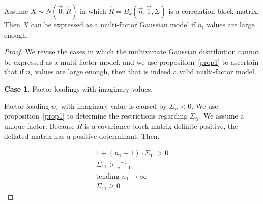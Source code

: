 \documentclass[11pt,fleqn]{book} %
\begin{document}
\begin{proposition}
	\label{prop:gmfamgb}
	Assume $X \sim N(\vec{0},\widehat{R})$ in which 
	$\widehat{R}=B_k(\vec{n},\vec{1},\Sigma)$ is a correlation block matrix. 
	Then $X$ can be expressed as a multi-factor Gaussian model if $n_i$ 
	values are large enough.
\end{proposition}
\begin{proof}
	We revise the cases in which the multivariate Gaussian distribution cannot
	be expressed as a multi-factor model, and we use proposition~\ref{prop1}
	to ascertain that if $n_i$ values are large enough, then 
	that is indeed a valid multi-factor model.
	
	\textbf{Case 1}. Factor loadings with imaginary values.
	\begin{adjustwidth}{1cm}{0pt}
		Factor loading $w_i$ with imaginary value is caused by $\Sigma_{ii} < 0$. 
		We use proposition~\ref{prop1} to determine the restrictions regarding 
		$\Sigma_{ii}$. We assume a unique factor.
		Because $\widehat{R}$ is a covariance block matrix definite-positive, 
		the deflated matrix has a positive determinant. Then,
	\end{adjustwidth}
	\begin{displaymath}
		\begin{array}{l}
			1 + (n_1-1) \cdot \Sigma_{11} > 0
			\\
			\Sigma_{11} > \frac{-1}{n_1-1} 
			\\
			\text{tending } n_1 \to \infty
			\\
			\Sigma_{11} \ge 0
		\end{array}
	\end{displaymath}
	

\end{proof}
\end{document}
